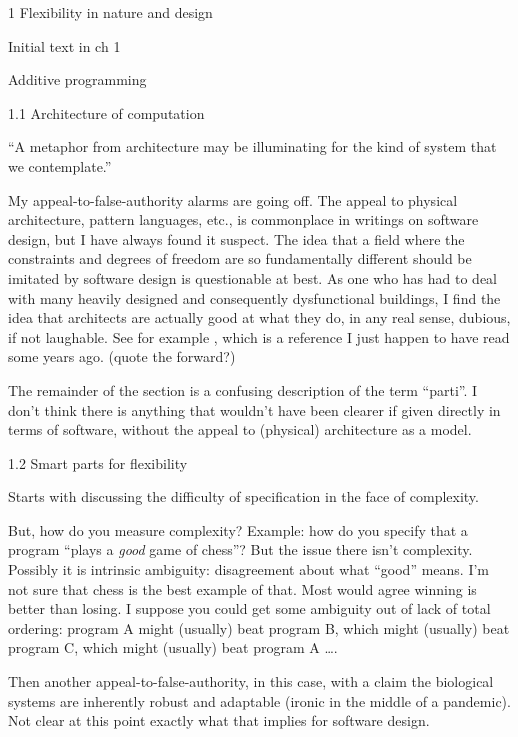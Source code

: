 \documentclass[12pt]{PalisadesLakesBook}
\begin{document}
\begin{plSection}{1 Flexibility in nature and design}
\begin{plSection}{Initial text in ch 1}
\begin{plSection}{Additive programming}
\end{plSection}%
\end{plSection}%
\begin{plSection}{1.1 Architecture of computation}

``A metaphor from architecture may be illuminating for the kind
of system that we contemplate.''

My appeal-to-false-authority alarms are going off.
The appeal to physical architecture, pattern languages, etc.,
is commonplace in writings on software design,
but I have always found it suspect.
The idea that a field 
where the constraints and degrees of freedom
are so fundamentally different should be imitated 
by software design is questionable at best.
As one who has had to deal with many heavily designed
and consequently dysfunctional buildings,
I find the idea that architects are actually good at what they do,
in any real sense, dubious, if not laughable.
See for example ,
which is a reference I just happen to have read some years ago.
(\TODO quote the forward?)

The remainder of the section is a confusing description 
of the term ``parti''.
I don't think there is anything that wouldn't have been 
clearer if given directly in terms of software,
without the appeal to (physical) architecture as a model. 

\end{plSection}%
\begin{plSection}{1.2 Smart parts for flexibility}

Starts with discussing the difficulty of specification
in the face of complexity. 

But, how do you measure complexity?
Example: how do you specify that a program
``plays a \emph{good} game of chess''?
But the issue there isn't complexity.
Possibly it is intrinsic ambiguity: disagreement about what
``good'' means.
I'm not sure that chess is the best example of that.
Most would agree winning is better than losing.
I suppose you could get some ambiguity out of lack of
total ordering: 
program A might (usually) beat program B,
which might (usually) beat program C, 
which might (usually) beat program A {\ldots}.

Then another appeal-to-false-authority,
in this case, with a claim the biological systems
are inherently robust and adaptable
(ironic in the middle of a pandemic).
Not clear at this point exactly what that implies for software
design.


\end{plSection}
\end{plSection}
\end{document}
